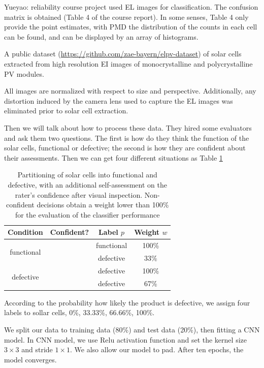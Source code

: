 \documentclass[12pt]{article}
\newcommand{\cmark}{\ding{51}}%
\newcommand{\xmark}{\ding{55}}%
\begin{document}
Yueyao: reliability course project used EL images for classification. The confusion matrix is obtained (Table 4 of the course report). In some senses, Table 4 only provide the point estimates, with PMD the distribution of the counts in each cell can be found, and can be displayed by an array of histograms. 


A public dataset (\url{https://github.com/zae-bayern/elpv-dataset}) of solar cells extracted from high resolution EI images of monocrystalline and polycrystalline PV modules.


All images are normalized with respect to size and perspective. Additionally, any distortion induced by the camera lens used to capture the EL images was eliminated prior to solar cell extraction.

Then we will talk about how to process these data. They hired some evaluators and ask them two questions. The first is how do they think the function of the solar cells, functional or defective; the second is how they are confident about their assessments. Then we can get four different situations as Table \ref{tt}

\begin{table}[h!]
	\centering
	\caption{Partitioning of solar cells into functional and defective, with an additional self-assessment on the rater's confidence after visual inspection. Non-confident decisions obtain a weight lower than 100\% for the evaluation of the classifier performance }
	\begin{tabular}{c|c|c|c}
		\hline
		\hline
		Condition  & Confident?  &  Label $p$ & Weight $w$ \\
		\hline
		\multirow{2}{*}{functional} & \cmark & functional & 100\% \\
		& \xmark& defective  & 33\% \\
		\hline
		\multirow{2}{*}{defective} & \cmark & defective & 100\%  \\
		& \xmark & defective & 67\% \\
		\hline
		\hline
	\end{tabular}
	
	
	
	\label{tt}
	
\end{table}
According to the probability how likely the product is defective, we assign four labels to sollar cells, 0\%, 33.33\%, 66.66\%, 100\%.

We split our data to training data (80\%) and test data (20\%), then fitting a CNN model. In CNN model, we use Relu activation function and set the kernel size $3 \times 3$ and stride $1 \times 1$. We also allow our model to pad. After ten epochs, the model converges.
\end{document}
